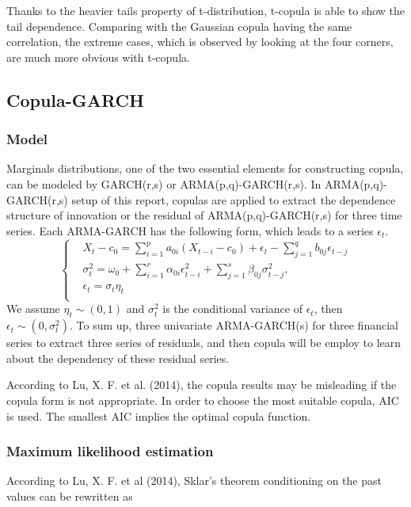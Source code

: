 \documentclass[12pt,a4paper]{article}
\numberwithin{equation}{section}
\begin{document}
 Thanks to the heavier tails property of t-distribution, t-copula is able to show the tail dependence. Comparing with the Gaussian copula having the same correlation, the extreme cases, which is observed by looking at the four corners, are much more obvious with t-copula. 
 
 \subsection{Copula-GARCH}
 
 \subsubsection{Model}
 Marginals distributions, one of the two essential elements for constructing copula, can be modeled by GARCH(r,s) or ARMA(p,q)-GARCH(r,s). In ARMA(p,q)-GARCH(r,s) setup of this report, copulas are applied to extract the dependence structure of innovation or the residual of ARMA(p,q)-GARCH(r,s) for three time series. Each ARMA-GARCH has the following form, which leads to a series $\epsilon_t$.
 \begin{equation}
 \begin{cases}
 & X_t - c_0 = \sum_{i=1}^{p} a_{0i} (X_{t-i} - c_0) + \epsilon_t - \sum_{j=1}^{q}b_{0j} \epsilon_{t-j} \\
 & \sigma_t^2 = \omega_0 + \sum_{i=1}^{r} \alpha_{0i} \epsilon_{t-i}^2 + \sum_{j=1}^{s}\beta_{0j}\sigma_{t-j}^2, \\
 & \epsilon_t = \sigma_t \eta_t \\
 \end{cases}
 \end{equation}
 We assume $\eta_t \sim (0,1)$ and $\sigma_t^2$ is the conditional variance of $\epsilon_t$, then $\epsilon_t \sim (0, \sigma_t^2)$. To sum up, three univariate ARMA-GARCH(s) for three financial series to extract three series of residuals, and then copula will be employ to learn about the dependency of these residual series.
 
 According to Lu, X. F. et al. (2014), the copula results may be misleading if the copula form is not appropriate. In order to choose the most suitable copula, AIC is used. The smallest AIC implies the optimal copula function.
 
 \subsubsection{Maximum likelihood estimation}
 According to Lu, X. F. et al (2014), Sklar's theorem conditioning on the past values can be rewritten as
 
\end{document}
